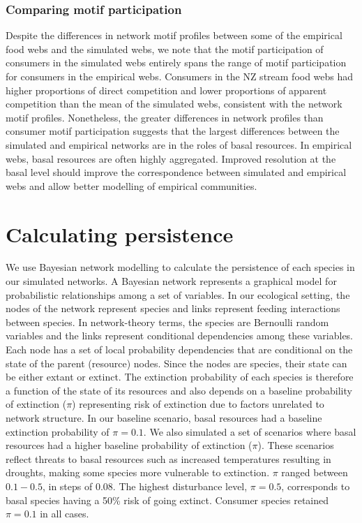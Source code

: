 \documentclass[12pt]{article}
\begin{document}
\begin{spacing}{2.0}
    
    \subsubsection{Comparing motif participation}
      
      Despite the differences in network motif profiles between some of the empirical food webs and the simulated webs, we note that the motif participation of consumers in the simulated webs entirely spans the range of motif participation for consumers in the empirical webs.
      Consumers in the NZ stream food webs had higher proportions of direct competition and lower proportions of apparent competition than the mean of the simulated webs, consistent with the network motif profiles.
      Nonetheless, the greater differences in network profiles than consumer motif participation suggests that the largest differences between the simulated and empirical networks are in the roles of basal resources.
      In empirical webs, basal resources are often highly aggregated. 
      Improved resolution at the basal level should improve the correspondence between simulated and empirical webs and allow better modelling of empirical communities.
    

\clearpage        

        
\section{Calculating persistence}        

        We use Bayesian network modelling to calculate the persistence of each species in our simulated networks. 
        A Bayesian network represents a graphical model for probabilistic relationships among a set of variables. 
        In our ecological setting, the nodes of the network represent species and links represent feeding interactions between species.
        In network-theory terms, the species are Bernoulli random variables and the links represent conditional dependencies among these variables. 
        Each node has a set of local probability dependencies that are conditional on the state of the parent (resource) nodes. 
        Since the nodes are species, their state can be either extant or extinct.
        The extinction probability of each species is therefore a function of the state of its resources and also depends on a baseline probability of extinction ($\pi$) representing risk of extinction due to factors unrelated to network structure.
        In our baseline scenario, basal resources had a baseline extinction probability of $\pi = 0.1$. 
        We also simulated a set of scenarios where basal resources had a higher baseline probability of extinction ($\pi$). 
        These scenarios reflect threats to basal resources such as increased temperatures resulting in droughts, making some species more vulnerable to extinction.
        $\pi$ ranged between $0.1-0.5$, in steps of $0.08$. 
        The highest disturbance level, $\pi = 0.5$, corresponds to basal species having a 50\% risk of going extinct. 
        Consumer species retained $\pi=0.1$ in all cases.



\end{spacing}
\end{document}
